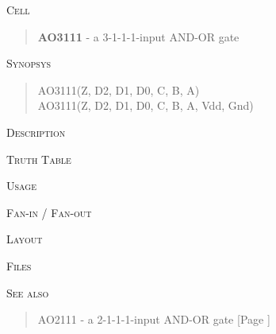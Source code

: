 
\label{AO3111}
\textsc{Cell}
\begin{quote}
    \textbf{AO3111} - a 3-1-1-1-input AND-OR gate
\end{quote}

\textsc{Synopsys}
\begin{quote}
    AO3111(Z, D2, D1, D0, C, B, A) \\
    AO3111(Z, D2, D1, D0, C, B, A, Vdd, Gnd)
\end{quote}

\textsc{Description}

%

\textsc{Truth Table}


\textsc{Usage}

\textsc{Fan-in / Fan-out}

\textsc{Layout}

\textsc{Files}

\textsc{See also}
\begin{quote}
    AO2111 - a 2-1-1-1-input AND-OR gate [Page \pageref{AO2111}]
\end{quote}
